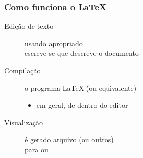 \begin{frame}

  \frametitle{Como funciona o \LaTeX}


  \begin{description}
  \item[Edição de texto] usando  apropriado\\
    escreve-se  que descreve o documento

\bigskip
	

  \item[Compilação]  o programa \LaTeX{} (ou equivalente)
    \begin{itemize}
    \item em geral, de dentro do editor
    \end{itemize}

\bigskip

  \item[Visualização] é gerado arquivo 
      (ou outros)\\
    para  ou 


  \end{description}












\end{frame}


